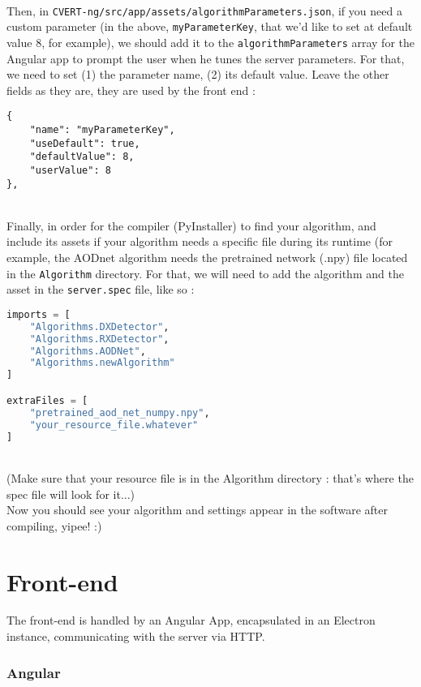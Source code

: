 \documentclass[12pt,a4paper]{article}
\begin{document}
~\\
Then, in \texttt{CVERT-ng/src/app/assets/algorithmParameters.json}, if you need a custom parameter (in the above, \texttt{myParameterKey}, that we'd like to set at default value 8, for example), we should add it to the \texttt{algorithmParameters} array for the Angular app to prompt the user when he tunes the server parameters. For that, we need to set (1) the parameter name, (2) its default value. Leave the other fields as they are, they are used by the front end :\\

\begin{lstlisting}
{
    "name": "myParameterKey",
    "useDefault": true,
    "defaultValue": 8,
    "userValue": 8
},
\end{lstlisting}

~\\
Finally, in order for the compiler (PyInstaller) to find your algorithm, and include its assets if your algorithm needs a specific file during its runtime (for example, the AODnet algorithm needs the pretrained network (.npy) file located in the \texttt{Algorithm} directory. For that, we will need to add the algorithm and the asset in the \texttt{server.spec} file, like so :\\

\begin{lstlisting}[language=Python]
imports = [
    "Algorithms.DXDetector",
    "Algorithms.RXDetector",
    "Algorithms.AODNet",
    "Algorithms.newAlgorithm"
]

extraFiles = [
    "pretrained_aod_net_numpy.npy",
    "your_resource_file.whatever"
]
\end{lstlisting}
~\\
(Make sure that your resource file is in the Algorithm directory : that's where the spec file will look for it...)\\

Now you should see your algorithm and settings appear in the software after compiling, yipee! :)

\pagebreak

\part{Front-end}
\setcounter{section}{0}

The front-end is handled by an Angular App, encapsulated in an Electron instance, communicating with the server via HTTP.

\section{Angular}
\end{document}
